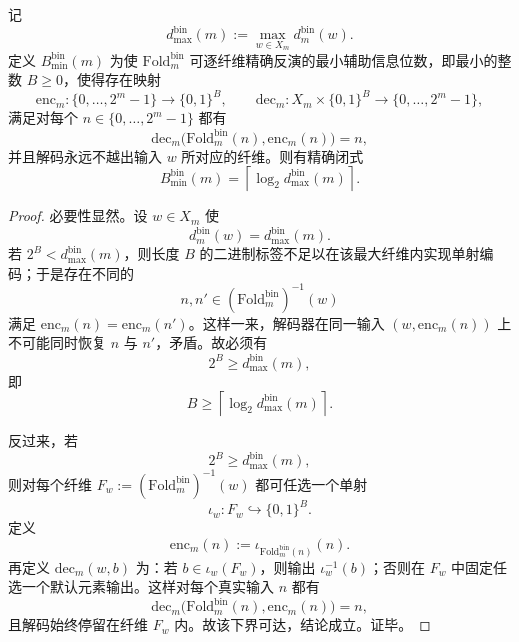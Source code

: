 \begin{theorem}\label{thm:xi-foldbin-exact-inversion-minimal-advice-bits}
记
\[
d_{\max}^{\mathrm{bin}}(m):=\max_{w\in X_m}d_m^{\mathrm{bin}}(w).
\]
定义 \(B_{\min}^{\mathrm{bin}}(m)\) 为使 \(\mathrm{Fold}^{\mathrm{bin}}_m\) 可逐纤维精确反演的最小辅助信息位数，即最小的整数 \(B\ge 0\)，使得存在映射
\[
\mathrm{enc}_m:\{0,\dots,2^m-1\}\to\{0,1\}^{B},
\qquad
\mathrm{dec}_m:X_m\times\{0,1\}^{B}\to\{0,\dots,2^m-1\},
\]
满足对每个 \(n\in\{0,\dots,2^m-1\}\) 都有
\[
\mathrm{dec}_m\bigl(\mathrm{Fold}^{\mathrm{bin}}_m(n),\mathrm{enc}_m(n)\bigr)=n,
\]
并且解码永远不越出输入 \(w\) 所对应的纤维。则有精确闭式
\[
\boxed{\;
B_{\min}^{\mathrm{bin}}(m)
=
\left\lceil \log_2 d_{\max}^{\mathrm{bin}}(m)\right\rceil.\;}
\]
\end{theorem}
\begin{proof}
必要性显然。设 \(w\in X_m\) 使
\[
d_m^{\mathrm{bin}}(w)=d_{\max}^{\mathrm{bin}}(m).
\]
若 \(2^B<d_{\max}^{\mathrm{bin}}(m)\)，则长度 \(B\) 的二进制标签不足以在该最大纤维内实现单射编码；于是存在不同的
\[
n,n'\in (\mathrm{Fold}^{\mathrm{bin}}_m)^{-1}(w)
\]
满足 \(\mathrm{enc}_m(n)=\mathrm{enc}_m(n')\)。这样一来，解码器在同一输入 \((w,\mathrm{enc}_m(n))\) 上不可能同时恢复 \(n\) 与 \(n'\)，矛盾。故必须有
\[
2^B\ge d_{\max}^{\mathrm{bin}}(m),
\]
即
\[
B\ge \left\lceil \log_2 d_{\max}^{\mathrm{bin}}(m)\right\rceil.
\]

反过来，若
\[
2^B\ge d_{\max}^{\mathrm{bin}}(m),
\]
则对每个纤维 \(F_w:=(\mathrm{Fold}^{\mathrm{bin}}_m)^{-1}(w)\) 都可任选一个单射
\[
\iota_w:F_w\hookrightarrow \{0,1\}^{B}.
\]
定义
\[
\mathrm{enc}_m(n):=\iota_{\mathrm{Fold}^{\mathrm{bin}}_m(n)}(n).
\]
再定义 \(\mathrm{dec}_m(w,b)\) 为：若 \(b\in \iota_w(F_w)\)，则输出 \(\iota_w^{-1}(b)\)；否则在 \(F_w\) 中固定任选一个默认元素输出。这样对每个真实输入 \(n\) 都有
\[
\mathrm{dec}_m\bigl(\mathrm{Fold}^{\mathrm{bin}}_m(n),\mathrm{enc}_m(n)\bigr)=n,
\]
且解码始终停留在纤维 \(F_w\) 内。故该下界可达，结论成立。证毕。
\end{proof}

